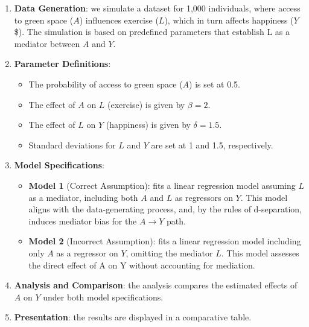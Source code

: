 \documentclass[
  singlecolumn]{article}
\providecommand{\tightlist}{%
  \setlength{\itemsep}{0pt}\setlength{\parskip}{0pt}}\usepackage{longtable,booktabs,array}
\begin{document}
\begin{enumerate}
\def\labelenumi{\arabic{enumi}.}
\item
  \textbf{Data Generation}: we simulate a dataset for 1,000 individuals,
  where access to green space (\(A\)) influences exercise (\(L\)), which
  in turn affects happiness (\(Y\)\$). The simulation is based on
  predefined parameters that establish L as a mediator between \(A\) and
  \(Y\).
\item
  \textbf{Parameter Definitions}:

  \begin{itemize}
  \tightlist
  \item
    The probability of access to green space (\(A\)) is set at 0.5.
  \item
    The effect of \(A\) on \(L\) (exercise) is given by \(\beta = 2\).
  \item
    The effect of \(L\) on \(Y\) (happiness) is given by
    \(\delta = 1.5\).
  \item
    Standard deviations for \(L\) and \(Y\) are set at 1 and 1.5,
    respectively.
  \end{itemize}
\item
  \textbf{Model Specifications}:

  \begin{itemize}
  \tightlist
  \item
    \textbf{Model 1} (Correct Assumption): fits a linear regression
    model assuming \(L\) as a mediator, including both \(A\) and \(L\)
    as regressors on \(Y\). This model aligns with the data-generating
    process, and, by the rules of d-separation, induces mediator bias
    for the \(A\to Y\) path.
  \item
    \textbf{Model 2} (Incorrect Assumption): fits a linear regression
    model including only \(A\) as a regressor on \(Y\), omitting the
    mediator \(L\). This model assesses the direct effect of A on Y
    without accounting for mediation.
  \end{itemize}
\item
  \textbf{Analysis and Comparison}: the analysis compares the estimated
  effects of \(A\) on \(Y\) under both model specifications.
\item
  \textbf{Presentation}: the results are displayed in a comparative
  table.
\end{enumerate}
\end{document}
